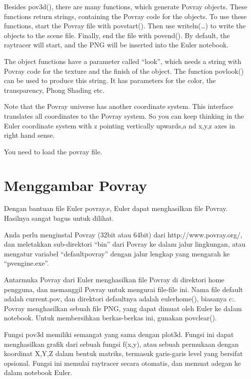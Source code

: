 \documentclass[
]{book}
\begin{document}
Besides pov3d(), there are many functions, which generate Povray objects. These functions return strings, containing the Povray code for the objects. To use these functions, start the Povray file with povstart(). Then use writeln(\ldots) to write the objects to the scene file. Finally, end the file with povend(). By default, the raytracer will start, and the PNG will be inserted into the Euler notebook.

The object functions have a parameter called ``look'', which needs a string with Povray code for the texture and the finish of the object. The function povlook() can be used to produce this string. It has parameters for the color, the transparency, Phong Shading etc.

Note that the Povray universe has another coordinate system. This interface translates all coordinates to the Povray system. So you can keep thinking in the Euler coordinate system with z pointing vertically upwards,a nd x,y,z axes in right hand sense.

You need to load the povray file.

\section{Menggambar Povray}\label{menggambar-povray-1}

Dengan bantuan file Euler povray.e, Euler dapat menghasilkan file Povray. Hasilnya sangat bagus untuk dilihat.

Anda perlu menginstal Povray (32bit atau 64bit) dari http://www.povray.org/, dan meletakkan sub-direktori ``bin'' dari Povray ke dalam jalur lingkungan, atau mengatur variabel ``defaultpovray'' dengan jalur lengkap yang mengarah ke ``pvengine.exe''.

Antarmuka Povray dari Euler menghasilkan file Povray di direktori home pengguna, dan memanggil Povray untuk mengurai file-file ini. Nama file default adalah current.pov, dan direktori defaultnya adalah eulerhome(), biasanya c:\Users\Username\Euler. Povray menghasilkan sebuah file PNG, yang dapat dimuat oleh Euler ke dalam notebook. Untuk membersihkan berkas-berkas ini, gunakan povclear().

Fungsi pov3d memiliki semangat yang sama dengan plot3d. Fungsi ini dapat menghasilkan grafik dari sebuah fungsi f(x,y), atau sebuah permukaan dengan koordinat X,Y,Z dalam bentuk matriks, termasuk garis-garis level yang bersifat opsional. Fungsi ini memulai raytracer secara otomatis, dan memuat adegan ke dalam notebook Euler.
\end{document}
